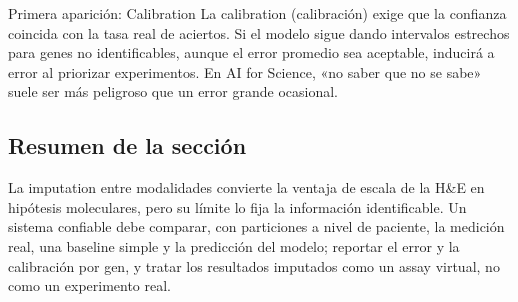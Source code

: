 \begin{knowledgebox}{Primera aparición: Calibration}
La calibration (calibración) exige que la confianza coincida con la tasa real de aciertos. Si el modelo sigue dando intervalos estrechos para genes no identificables, aunque el error promedio sea aceptable, inducirá a error al priorizar experimentos. En AI for Science, «no saber que no se sabe» suele ser más peligroso que un error grande ocasional.
\end{knowledgebox}

\subsection{Resumen de la sección}

La imputation entre modalidades convierte la ventaja de escala de la H\&E en hipótesis moleculares, pero su límite lo fija la información identificable. Un sistema confiable debe comparar, con particiones a nivel de paciente, la medición real, una baseline simple y la predicción del modelo; reportar el error y la calibración por gen, y tratar los resultados imputados como un assay virtual, no como un experimento real.
